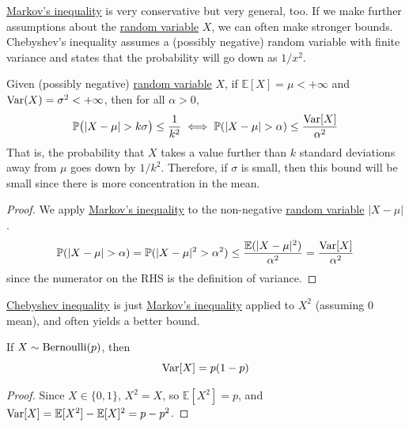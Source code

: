   \hyperref[thm:markovs-inequality]{Markov's inequality} is very conservative but very general, too. If we make further assumptions about the \hyperref[def:random-variable]{random variable} $X$, we can often make stronger bounds. Chebyshev's inequality assumes a (possibly negative) random variable with finite variance and states that the probability will go down as $1/x^2$. 

  \begin{theorem}
    \label{thm:chebyshev-inequality}
    Given (possibly negative) \hyperref[def:random-variable]{random variable} $X$, if $\mathbb{E}[X] = \mu < +\infty$ and $\operatorname{Var}(X) = \sigma^2 < +\infty$, then for all $\alpha > 0$, 
    \begin{equation}
      \mathbb{P} \big( |X - \mu| > k \sigma \big) \leq \frac{1}{k^2} \iff \mathbb{P}(|X - \mu| > \alpha) \leq \frac{\operatorname{Var}[X]}{\alpha^2}
    \end{equation}
    That is, the probability that $X$ takes a value further than $k$ standard deviations away from $\mu$ goes down by $1/k^2$. Therefore, if $\sigma$ is small, then this bound will be small since there is more concentration in the mean. 
  \end{theorem}
  \begin{proof}
    We apply \hyperref[thm:markovs-inequality]{Markov's inequality} to the non-negative \hyperref[def:random-variable]{random variable} $|X - \mu|$. 
    \begin{equation}
      \mathbb{P}(|X - \mu| > \alpha) = \mathbb{P}(|X - \mu|^2 > \alpha^2) \leq \frac{\mathbb{E}(|X - \mu|^2)}{\alpha^2} = \frac{\operatorname{Var}[X]}{\alpha^2}
    \end{equation}
    since the numerator on the RHS is the definition of variance. 
  \end{proof}

  \hyperref[thm:chebyshev-inequality]{Chebyshev inequality} is just \hyperref[thm:markovs-inequality]{Markov's inequality} applied to $X^2$ (assuming $0$ mean), and often yields a better bound.

  \begin{theorem}
    \label{thm:variance-of-bernoulli}
    If \hyperref[def:indicator-bernoulli-random-variable]{$X \sim \operatorname{Bernoulli}(p)$}, then 
    \begin{equation}
      \operatorname{Var}[X] = p (1 - p)
    \end{equation}
  \end{theorem}
  \begin{proof}
    Since $X \in \{0, 1\}$, $X^2 = X$, so $\mathbb{E}[X^2] = p$, and $\operatorname{Var}[X] = \mathbb{E}[X^2] - \mathbb{E}[X]^2 = p - p^2$. 
  \end{proof}


